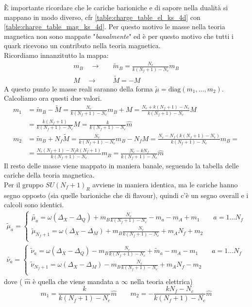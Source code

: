 \documentclass[a4paper,12pt]{article}
\begin{document}
È importante ricordare che le cariche barioniche e di sapore nella dualità si mappano in modo diverso, cfr \ref{table:charge_table_el_ks_4d} con \ref{table:charge_table_mag_ks_4d}.  Per questo motivo le masse nella teoria magnetica non sono mappate "\emph{banalmente}" ed è per questo motivo che tutti i quark ricevono un contributo nella teoria magnetica.
\\
Ricordiamo innanzitutto la mappa:
\begin{align*}
 m_B \quad \longrightarrow \quad & \tilde{m}_B = \frac{N_c}{k(N_f+1)-N_c} m_B \\  M \quad \longrightarrow \quad &\tilde{M} = - M
\end{align*}
A questo punto le masse reali saranno della forma $ \tilde{\mu} = \mbox{diag} ( m_1 , \dots , m_2)$. Calcoliamo ora questi due valori.
\begin{align*} 
m_1 & = \tilde{m}_B - \tilde{M} = \frac{N_c}{k(N_f+1)-N_c} m_B + M = \frac{N_c + k (N_f+1) - N_c }{k(N_f+1)-N_c} M \\
& = \frac{k (N_f+1) }{k(N_f+1)-N_c} M = \frac{k}{k(N_f+1)-N_c} \hat{m} \\
m_2 & = \tilde{m}_B + N_f \tilde{M} = \frac{N_c}{k(N_f+1)-N_c} m_B -N_f M = \frac{N_c - N_f( k(N_f+1) - N_c)}{k(N_f+1)-N_c} m_B = \\ 
	& = \frac{N_c(N_f+1) - N_f k (N_f+1)}{k(N_f+1)-N_c} m_B  = \frac{N_c - k N_f}{k(N_f+1)-N_c} \hat{m}   
\end{align*}
Il resto delle masse viene mappato in maniera banale, seguendo la tabella delle cariche della teoria magnetica. \\
Per il gruppo $SU(N_f+1)_R $ avviene in maniera identica, ma le cariche hanno segno opposto (sia quelle barioniche che di flavour), quindi c'è un segno overall e i calcoli sono identici.
\begin{align*}
	 \tilde \mu_a =
	 \begin{cases}
	  \tilde{ \mu_a} =  \omega ( \Delta_X - \Delta_Q ) + m_B \frac{N_c}{k(N_f +1) - N_c} - m_a  - m_A + m_1  \qquad a = 1 \dots N_f \\
	  \tilde \mu_{N_f+1} =  \omega ( \Delta_X - \Delta_M ) + m_B \frac{N_c}{k(N_f +1) - N_c} +  m_A N_f + m_2    \\
	 \end{cases} 
	 \\
\tilde{ \nu_a} = 	
	\begin{cases}
	\tilde \nu_a = \omega ( \Delta_X - \Delta_Q ) - m_B \frac{N_c}{k(N_f +1) - N_c}  + \tilde m_a  - m_A - m_1 \qquad a = 1 \dots N_f\\
	 \tilde \nu_{N_f+1} = \omega ( \Delta_X - \Delta_M ) - m_B \frac{N_c}{k(N_f +1) - N_c}  +  m_A N_f- m_2 \\
	\end{cases}	 
\end{align*}
dove ( $\hat{m}$ è quella che viene mandata a $\infty$ nella teoria elettrica)
$$
 m_1  = \frac{k}{k(N_f+1) - N_c} \hat{m} \qquad m_2 = - \frac{k N_f - N_c}{k(N_f+1)-N_c} \hat{m}
$$
\end{document}
